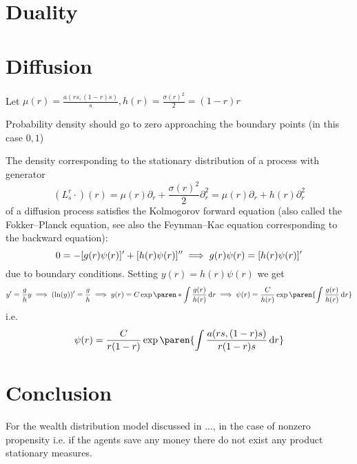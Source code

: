 \documentclass{article}
\begin{document}
\hdots


\section{Duality}



\section{Diffusion}


Let $\mu(r) = \frac{a(rs, (1-r)s)}{s}, h(r) = \frac{\sigma(r)^2}{2}=(1-r)r$

Probability density should go to zero approaching the boundary points (in this case $0, 1$) 

The density corresponding to the stationary distribution of a process with generator
\[
(L_s^r \cdot)(r)
= \mu(r) \partial_r + \frac{\sigma(r)^2}{2} \partial_r^2
= \mu(r) \partial_r + h(r) \partial_r^2
\]
of a diffusion process satisfies the Kolmogorov forward equation (also called the Fokker--Planck equation, see also the Feynman--Kac equation corresponding to the backward equation):
\[
0 = -[g(r) \psi(r)]' + [h(r) \psi(r)]''
\\\implies g(r) \psi(r) = [h(r) \psi(r)]'
\]
due to boundary conditions. Setting $y(r) = h(r) \psi(r)$ we get
\[
y' = \frac{g}{h} y \implies (\ln(y))' = \frac{g}{h}
\\ \implies y(r) = C \exp\paren*{ \int \frac{g(r)}{h(r)}\diff r }
\\ \implies \psi(r) = \frac{C}{h(r)} \exp\paren{ \int \frac{g(r)}{h(r)}\diff r }
\]
i.e.
\[
\psi(r) = \frac{C}{r(1-r)} \exp\paren{ \int \frac{a(rs, (1-r)s)}{r(1-r)s}\diff r }
\]


\section*{Conclusion}
For the wealth distribution model discussed in ..., in the case of nonzero propensity i.e. if the agents save any money there do not exist any product stationary measures.
\end{document}
